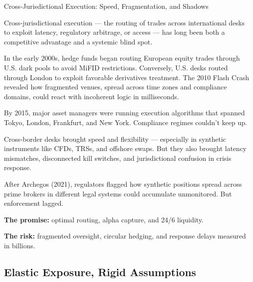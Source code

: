 \medskip

\begin{HistoricalSidebar}{Cross-Jurisdictional Execution: Speed, Fragmentation, and Shadows}

  Cross-jurisdictional execution — the routing of trades across international desks to exploit 
  latency, regulatory 
  arbitrage, or access — has long been both a competitive advantage and a systemic blind spot.

  \medskip
  
  In the early 2000s, hedge funds began routing European equity trades through U.S. dark pools 
  to avoid MiFID 
  restrictions. Conversely, U.S. desks routed through London to exploit favorable derivatives 
  treatment. The 2010 
  Flash Crash revealed how fragmented venues, spread across time zones and compliance domains, 
  could react with 
  incoherent logic in milliseconds.

  \medskip
  
  By 2015, major asset managers were running execution algorithms that spanned Tokyo, London, 
  Frankfurt, and New 
  York. Compliance regimes couldn’t keep up.

  \medskip
  
  Cross-border desks brought speed and flexibility — especially in synthetic instruments like 
  CFDs, TRSs, and 
  offshore swaps. But they also brought latency mismatches, disconnected kill switches, and 
  jurisdictional confusion 
  in crisis response.

  \medskip
  
  After Archegos (2021), regulators flagged how synthetic positions spread across prime brokers in 
  different legal 
  systems could accumulate unmonitored. But enforcement lagged.

  \medskip
  
  \textbf{The promise:} optimal routing, alpha capture, and 24/6 liquidity.

  \medskip

  \textbf{The risk:} fragmented oversight, circular hedging, and response delays measured in billions.
  
\end{HistoricalSidebar}

\medskip



\subsection{Elastic Exposure, Rigid Assumptions}

